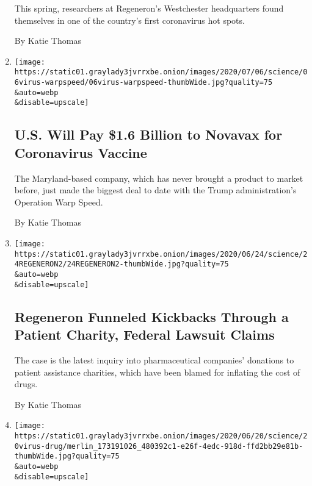 \begin{enumerate}
  This spring, researchers at Regeneron's Westchester headquarters found
  themselves in one of the country's first coronavirus hot spots.

  By Katie Thomas
\item
  \href{/2020/07/07/health/novavax-coronavirus-vaccine-warp-speed.html}{}

  \texttt{[image: https://static01.graylady3jvrrxbe.onion/images/2020/07/06/science/06virus-warpspeed/06virus-warpspeed-thumbWide.jpg?quality=75\\\&auto=webp\\\&disable=upscale]}

  \hypertarget{us-will-pay-16-billion-to-novavax-for-coronavirus-vaccine}{%
  \subsection{U.S. Will Pay \$1.6 Billion to Novavax for Coronavirus
  Vaccine}\label{us-will-pay-16-billion-to-novavax-for-coronavirus-vaccine}}

  The Maryland-based company, which has never brought a product to
  market before, just made the biggest deal to date with the Trump
  administration's Operation Warp Speed.

  By Katie Thomas
\item
  \href{/2020/06/24/health/drug-kickbacks-regeneron.html}{}

  \texttt{[image: https://static01.graylady3jvrrxbe.onion/images/2020/06/24/science/24REGENERON2/24REGENERON2-thumbWide.jpg?quality=75\\\&auto=webp\\\&disable=upscale]}

  \hypertarget{regeneron-funneled-kickbacks-through-a-patient-charity-federal-lawsuit-claims}{%
  \subsection{Regeneron Funneled Kickbacks Through a Patient Charity,
  Federal Lawsuit
  Claims}\label{regeneron-funneled-kickbacks-through-a-patient-charity-federal-lawsuit-claims}}

  The case is the latest inquiry into pharmaceutical companies'
  donations to patient assistance charities, which have been blamed for
  inflating the cost of drugs.

  By Katie Thomas
\item
  \href{/2020/06/20/health/hydroxychloroquine-coronavirus-trial.html}{}

  \texttt{[image: https://static01.graylady3jvrrxbe.onion/images/2020/06/20/science/20virus-drug/merlin\_173191026\_480392c1-e26f-4edc-918d-ffd2bb29e81b-thumbWide.jpg?quality=75\\\&auto=webp\\\&disable=upscale]}


\end{enumerate}
